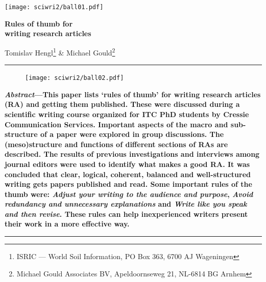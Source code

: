 \documentclass[graybox,envcountchap,sectrefs,UStrade]{svmono}
\begin{document}


\backmatter%





\cleardoublepage

\begin{flushright}
   \texttt{[image: sciwri2/ball01.pdf]}
    \vspace{-10pt}
\end{flushright}

\begin{center}
\LARGE\textbf{Rules of thumb for \\ writing research articles}
\end{center}

\bigskip

\begin{center}
\begin{minipage}[c]{.85\textwidth}
\centering
     \renewcommand{\footnoterule}{}
     \setcounter{mpfootnote}{0}%
     \renewcommand{\thempfootnote}{\alph{mpfootnote}}%
    Tomislav Hengl\footnote{ISRIC --- World Soil Information, PO Box 363, 6700 AJ Wageningen} \& Michael Gould\footnote{Michael Gould Associates BV, Apeldoornseweg 21, NL-6814 BG Arnhem}
\end{minipage}
\end{center}

\bigskip

\noindent\rule{\textwidth}{.5pt}
\begin{figure}
\centering
 \vspace{-10pt}
\texttt{[image: sciwri2/ball02.pdf]}
 \vspace{-20pt}
\end{figure}
\noindent\textbf{\emph{Abstract}---This paper lists `rules of thumb' for writing research articles (RA) and getting them published. These were discussed during a scientific writing course organized for ITC PhD students by Cressie Communication Services. Important aspects of the macro and sub-structure of a paper were explored in group discussions. The (meso)structure and functions of different sections of RAs are described. The results of previous investigations and interviews among journal editors were used to identify what makes a good RA.
It was concluded that clear, logical, coherent, balanced and well-structured writing gets papers published and read. Some important rules of the thumb were: \emph{Adjust your writing to the audience and purpose}, \emph{Avoid redundancy and unnecessary explanations} and \emph{Write like you speak and then revise}. These rules can help inexperienced writers present their work in a more effective way.}\par
\noindent\rule{\textwidth}{.5pt}
\end{document}
